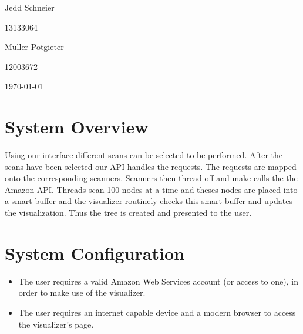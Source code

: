 \documentclass[hidelinks,a4paper,12pt]{article}
\begin{document}
\begin{titlepage}
\begin{center}
\begin{minipage}{0.4\textwidth}
\begin{flushleft} \large
Jedd Schneier
\end{flushleft}
\end{minipage}
\begin{minipage}{0.4\textwidth}
\begin{flushright} \large
\emph{}
13133064
\end{flushright}
\end{minipage}

\begin{minipage}{0.4\textwidth}
\begin{flushleft} \large
Muller Potgieter
\end{flushleft}
\end{minipage}
\begin{minipage}{0.4\textwidth}
\begin{flushright} \large
\emph{}
12003672
\end{flushright}
\end{minipage}

\vfill
{\large \today}
\end{center}
\end{titlepage}
\footnotesize
%
\normalsize


\tableofcontents
\newpage
{}

\newpage
\section{System Overview} 
Using our interface different scans can be selected to be performed. After the scans have been selected our API handles the requests. The requests are mapped onto the corresponding scanners. Scanners then thread off and make calls the the Amazon API. Threads scan 100 nodes at a time and theses nodes are placed into a smart buffer and the visualizer routinely checks this smart buffer and updates the visualization. Thus the tree is created and presented to the user. 

\section{System Configuration}
\begin {itemize}
	\item The user requires a valid Amazon Web Services account (or access to one), in order to make use of the visualizer.
	\item The user requires an internet capable device and a modern browser to access the visualizer's page.
\end{itemize}
\newpage
\end{document}
